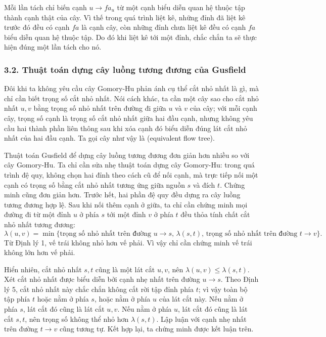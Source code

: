 \documentclass[11pt]{article}
\begin{document}
Mỗi lần tách chỉ biến cạnh \(u\to fa_u\) từ một cạnh biểu diễn quan hệ thuộc
tập thành cạnh thật của cây. Vì thế trong quá trình liệt kê, những đỉnh đã
liệt kê trước đó đều có cạnh \(fa\) là cạnh cây, còn những đỉnh chưa liệt kê
đều có cạnh \(fa\) biểu diễn quan hệ thuộc tập. Do đó khi liệt kê tới một
đỉnh, chắc chắn ta sẽ thực hiện đúng một lần tách cho nó.

\subsubsection*{3.2. Thuật toán dựng cây luồng tương đương của Gusfield}

Đôi khi ta không yêu cầu cây Gomory-Hu phản ánh cụ thể cắt nhỏ nhất là gì, mà
chỉ cần biết trọng số cắt nhỏ nhất. Nói cách khác, ta cần một cây sao cho cắt
nhỏ nhất \(u,v\) bằng trọng số nhỏ nhất trên đường đi giữa \(u\) và \(v\) của
cây; với mỗi cạnh cây, trọng số cạnh là trọng số cắt nhỏ nhất giữa hai đầu
cạnh, nhưng không yêu cầu hai thành phần liên thông sau khi xóa cạnh đó biểu
diễn đúng lát cắt nhỏ nhất của hai đầu cạnh. Ta gọi cây như vậy là  (equivalent flow tree).

Thuật toán Gusfield để dựng cây luồng tương đương đơn giản hơn nhiều so với
cây Gomory-Hu. Ta chỉ cần sửa nhẹ thuật toán dựng cây Gomory-Hu: trong quá
trình đệ quy, không chọn hai đỉnh theo cách cũ để nối cạnh, mà trực tiếp nối
một cạnh có trọng số bằng cắt nhỏ nhất tương ứng giữa nguồn \(s\) và đích
\(t\). Chứng minh cũng đơn giản hơn. Trước hết, hai phần đệ quy đều dựng ra
cây luồng tương đương hợp lệ. Sau khi nối thêm cạnh ở giữa, ta chỉ cần chứng
minh mọi đường đi từ một đỉnh \(u\) ở phía \(s\) tới một đỉnh \(v\) ở phía
\(t\) đều thỏa tính chất cắt nhỏ nhất tương đương:
\[
  \lambda(u,v)
  = \min\{\text{trọng số nhỏ nhất trên đường }u\to s,\,
          \lambda(s,t),\,
          \text{trọng số nhỏ nhất trên đường }t\to v\}.
\]
Từ Định lý 1, vế trái không nhỏ hơn vế phải. Vì vậy chỉ cần chứng minh vế
trái không lớn hơn vế phải.

Hiển nhiên, cắt nhỏ nhất \(s,t\) cũng là một lát cắt \(u,v\), nên
\(\lambda(u,v)\le\lambda(s,t)\). Xét cắt nhỏ nhất được biểu diễn bởi cạnh nhẹ
nhất trên đường \(u\to s\). Theo Định lý 5, cắt nhỏ nhất này chắc chắn không
cắt rời tập đỉnh phía \(t\); vì vậy toàn bộ tập phía \(t\) hoặc nằm ở phía
\(s\), hoặc nằm ở phía \(u\) của lát cắt này. Nếu nằm ở phía \(s\), lát cắt
đó cũng là lát cắt \(u,v\). Nếu nằm ở phía \(u\), lát cắt đó cũng là lát cắt
\(s,t\), nên trọng số không thể nhỏ hơn \(\lambda(s,t)\). Lập luận với cạnh
nhẹ nhất trên đường \(t\to v\) cũng tương tự. Kết hợp lại, ta chứng minh được
kết luận trên.
\end{document}
